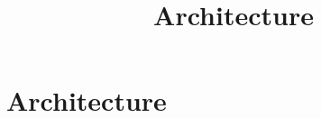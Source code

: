 \documentclass[../../OAE-SPEC-MAIN.tex]{subfiles}
\title{Architecture}
\begin{document}
\chapter{Architecture}\label{sec:architecture}


\clearpage

\clearpage

\clearpage

\clearpage

\end{document}
